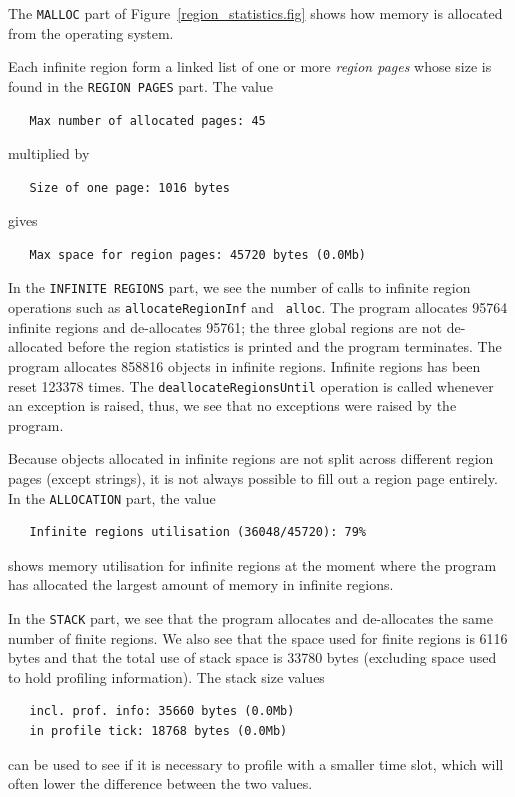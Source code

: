 \documentclass[12pt]{book}
\begin{document}
The {\tt MALLOC} part of Figure~\ref{region_statistics.fig} shows how
memory is allocated from the operating system.

Each infinite region form a linked list of one or more
% 
{\em region pages\/} whose size is found in the {\tt REGION PAGES}
part. The value
\begin{verbatim}
   Max number of allocated pages: 45
\end{verbatim}
multiplied by
\begin{verbatim}
   Size of one page: 1016 bytes
\end{verbatim}
gives 
\begin{verbatim}
   Max space for region pages: 45720 bytes (0.0Mb)
\end{verbatim}

In the {\tt INFINITE REGIONS} part, we see the number of calls to
infinite region operations such as {\tt allocateRegionInf} and {\tt
  alloc}. The program allocates 95764 infinite regions and
de-allocates 95761; the three global regions are not de-allocated
before the region statistics is printed and the program terminates.
The program allocates 858816 objects in infinite regions. Infinite
regions has been reset 123378 times. The {\tt deallocateRegionsUntil}
operation is called whenever an exception is raised, thus, we see that
no exceptions were raised by the program.

Because objects allocated in infinite regions are not split across
different region pages (except strings), it is not always possible to
fill out a region page entirely. In the {\tt ALLOCATION} part, the value
\begin{verbatim}
   Infinite regions utilisation (36048/45720): 79%
\end{verbatim}
shows memory utilisation for infinite regions at the moment where the
program has allocated the largest amount of memory in infinite
regions.

In the {\tt STACK} part, we see that the program allocates and
de-allocates the same number of finite regions. We also see that the
space used for finite regions is 6116 bytes and that the total use of
stack space is 33780 bytes (excluding space used to hold profiling
information). The stack size values
\begin{verbatim}
   incl. prof. info: 35660 bytes (0.0Mb)
   in profile tick: 18768 bytes (0.0Mb)
\end{verbatim}
can be used to see if it is necessary to profile with a smaller time
slot, which will often lower the difference between the two values.
\end{document}
